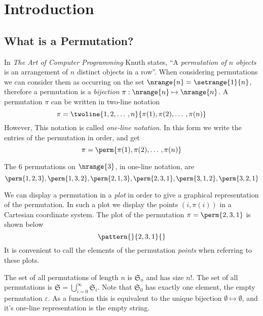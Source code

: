 \chapter{Introduction\label{cha:introduction}}
\section{What is a Permutation?}
In \emph{The Art of Computer Programming} \cite[p.~45]{Knuth:1997:ACP:260999} Knuth states,
\enquote{A \emph{permutation of \(n\) objects} is an arrangement of \(n\) distinct
objects in a row}.
When considering permutations we can consider them as
occurring on the set \(\nrange{n} = \setrange{1}{n}\), therefore a permutation
is a \emph{bijection} \(\pi:\nrange{n} \mapsto \nrange{n}\). A
permutation \(\pi\) can be written in two-line notation
\begin{equation*}
\pi = \twoline{1,2,\dotso,n}{\pi(1),\pi(2),\dotso,\pi(n)}
\end{equation*}
However,
This
notation
is called
\emph{one-line notation}.
In this form we write the entries of the permutation in order, and get
\begin{equation*}
\pi = \perm{\pi(1),\pi(2),\dotso,\pi(n)}
\end{equation*}

\begin{example}
The 6 permutations on \(\nrange{3}\), in one-line notation, are
\begin{equation*}
\perm{1,2,3},\perm{1,3,2},\perm{2,1,3},\perm{2,3,1}, \perm{3,1,2}, \perm{3,2,1}
\end{equation*}
\end{example}

We can display a permutation in a \emph{plot} in order to give a graphical
representation of the permutation. In such a plot we display the points
\((i,\pi(i))\) in a Cartesian coordinate system. The plot of the permutation
\(\pi = \perm{2,3,1}\) is shown below
\begin{equation*}
    \pattern{}{2,3,1}{}
\end{equation*}
It is convenient to call the elements of the permutation \emph{points} when
referring to these plots.

The set of all permutations of length \(n\) is \(\mathfrak{S}_n\) and
has size \(n!\). The set of all permutations is
\(\mathfrak{S}=\bigcup_{i=0}^{\infty}\mathfrak{S}_i\). Note that \(\mathfrak{S}_0\)
has exactly one element, the empty permutation \(\varepsilon\). As a function
this is equivalent to the unique bijection \(\emptyset \mapsto \emptyset\), and
it's one-line representation is the empty string.

